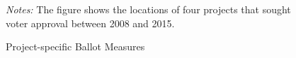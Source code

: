 \documentclass[article,12pt]{memoir}
\begin{document}
\begin{figure}[tb]\centering
  \caption{Project-specific Ballot Measures}
  \label{fig:hg_g_devs}
  \begin{measuredfigure}
  \end{measuredfigure}
  \begin{tablenotes}[flushleft]
    \item \hspace{-.2em}\emph{Notes:} The figure shows the locations of four projects that sought voter approval between 2008 and 2015.
  \end{tablenotes}
\end{figure}
\end{document}
